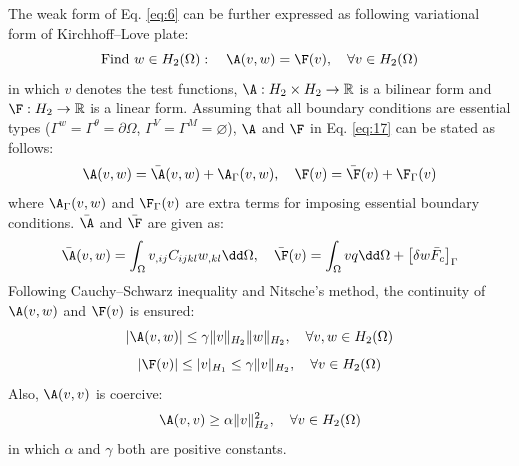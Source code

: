 The weak form of Eq. \eqref{eq:6} can be further expressed as following variational form of Kirchhoff--Love plate:
\begin{equation}\label{eq:17}
\text{Find }w\in H_2(\Omega):\quad \A(v,w)=\F(v),\quad \forall v\in H_2(\Omega)
\end{equation}
in which $v$ denotes the test functions, $\A:H_2\times H_2\to\mathbb{R}$ is a bilinear form and $\F:H_2\to\mathbb{R}$ is a linear form.
Assuming that all boundary conditions are essential types ($\Gamma^{w}=\Gamma^{\theta}=\partial\Omega$, $\Gamma^{V}=\Gamma^{M}=\varnothing$), $\A$ and $\F$ in Eq. \eqref{eq:17} can be stated as follows:
\begin{equation}\label{eq:18}
\A(v,w)=\bar{\A}(v,w)+\A_{\Gamma}(v,w),\quad \F(v)=\bar{\F}(v)+\F_{\Gamma}(v)
\end{equation}
where $\A_{\Gamma}(v,w)$ and $\F_{\Gamma}(v)$ are extra terms for imposing essential boundary conditions.
$\bar{\A}$ and $\bar{\F}$ are given as:
\begin{equation}\label{eq:19}
\bar{\A}(v,w)=\int_{\Omega}v_{,ij}C_{ijkl}w_{,kl}\dd\Omega,\quad
\bar{\F}(v)=\int_{\Omega}vq\dd\Omega+\left[\delta w\bar{F}_{c}\right]_{\Gamma}
\end{equation}
Following Cauchy--Schwarz inequality and Nitsche's method, the continuity of $\A(v,w)$ and $\F(v)$ is ensured:
\begin{equation}\label{eq:20}
\left|\A(v,w)\right|\le\gamma\|v\|_{H_2}\|w\|_{H_2},\quad \forall v,w\in H_2(\Omega)
\end{equation}
\begin{equation}\label{eq:21}
\left|\F(v)\right|\le|v|_{H_1}\le\gamma\|v\|_{H_2},\quad \forall v\in H_2(\Omega)
\end{equation}
Also, $\A(v,v)$ is coercive:
\begin{equation}\label{eq:22}
\A(v,v)\ge\alpha\|v\|^{2}_{H_2},\quad \forall v\in H_2(\Omega)
\end{equation}
in which $\alpha$ and $\gamma$ both are positive constants.

